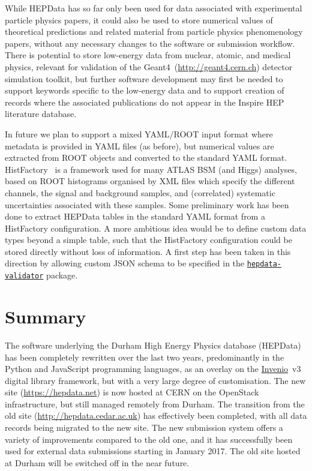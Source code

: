 \documentclass[a4paper]{jpconf}
\begin{document}
While HEPData has so far only been used for data associated with experimental
particle physics papers, it could also be used to store numerical values of
theoretical predictions and related material from particle physics
phenomenology papers, without any necessary changes to the software or
submission workflow.  There is potential to store low-energy data from nuclear,
atomic, and medical physics, relevant for validation of the
Geant4~(\url{http://geant4.cern.ch}) detector simulation toolkit, but further
software development may first be needed to support keywords specific to the
low-energy data and to support creation of records where the associated
publications do not appear in the Inspire HEP literature database.

In future we plan to support a mixed YAML/ROOT input format where metadata is
provided in YAML files (as before), but numerical values are extracted from
ROOT objects and converted to the standard YAML format.
 HistFactory~\cite{Cranmer:1456844} is a framework used for many ATLAS BSM (and
Higgs) analyses, based on ROOT histograms organised by XML files which specify
the different channels, the signal and background samples, and (correlated)
systematic uncertainties associated with these samples.  Some preliminary work
has been done to extract HEPData tables in the standard YAML format from a
HistFactory configuration.  A more ambitious idea would be to define custom
data types beyond a simple table, such that the HistFactory configuration could
be stored directly without loss of information.  A first step has been taken in
this direction by allowing custom JSON schema to be specified in the
\href{https://github.com/HEPData/hepdata-validator}{\texttt{hepdata-validator}}
package.

\section{Summary}

The software underlying the Durham High Energy Physics database (HEPData) has
been completely rewritten over the last two years, predominantly in the Python
and JavaScript programming languages, as an overlay on the
\href{http://inveniosoftware.org}{Invenio}~v3 digital library framework, but
with a very large degree of customisation.  The new site
(\url{https://hepdata.net}) is now hosted at CERN on the OpenStack
infrastructure, but still managed remotely from Durham.  The transition from
the old site (\url{http://hepdata.cedar.ac.uk}) has effectively been completed,
with all data records being migrated to the new site.  The new submission
system offers a variety of improvements compared to the old one, and it has
successfully been used for external data submissions starting in January
2017.  The old site hosted at Durham will be switched off in the near future.
\end{document}
